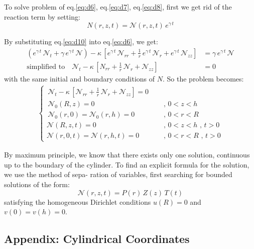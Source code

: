 \documentclass[../main.tex]{subfiles}
\begin{document}
To solve problem of eq.\ref{eq:d6}, eq.\ref{eq:d7}, eq.\ref{eq:d8}, first we get rid of the reaction term by setting:
\begin{equation}
    N(r,z,t) = \mathcal{N}(r,z,t) \, e^{\gamma \, t} \label{eq:d10}
\end{equation}

By substituting eq.\ref{eq:d10} into eq.\ref{eq:d6}, we get:
\begin{align}
    (e^{\gamma \, t} \, \mathcal{N}_t + \gamma \, e^{\gamma \, t} \, \mathcal{N}) - \kappa \, [e^{\gamma \, t} \, \mathcal{N}_{rr} + \frac{1}{r} \, e^{\gamma \, t} \, \mathcal{N}_r + e^{\gamma \, t} \, \mathcal{N}_{zz}] &= \gamma \, e^{\gamma \, t} \, \mathcal{N} \nonumber \\
    \text{simplified to} \quad \mathcal{N}_t - \kappa \, [N_{rr} + \frac{1}{r} \, \mathcal{N}_r + \mathcal{N}_{zz}] &= 0 \label{eq:d11}
\end{align}
with the same initial and boundary conditions of $N$. So the problem becomes:
\begin{align}
    \begin{cases}
        \, \mathcal{N}_t - \kappa \, [\mathcal{N}_{rr} + \frac{1}{r} \, \mathcal{N}_r + \mathcal{N}_{zz}] = 0 \\
        \, \mathcal{N}_0(R, z) = 0 & \quad \text{ ,  } 0 < z < h \\
        \, \mathcal{N}_0(r, 0) = \mathcal{N}_0(r, h) = 0 & \quad \text{ ,  } 0 < r < R \\
        \mathcal{N}(R, z, t) = 0 & \quad \text{ ,  } 0 < z < h \text{ ,  } t > 0 \\
        \mathcal{N}(r, 0, t) = \mathcal{N}(r, h, t) = 0 & \quad \text{ ,  } 0 < r < R \text{ ,  } t > 0 
    \end{cases}
\end{align}

By maximum principle, we know that there exists only one solution, continuous up to the boundary of the cylinder. To find an explicit formula for the solution, we use the method of sepa- ration of variables, first searching for bounded solutions of the form:
\begin{equation}
    \mathcal{N}(r,z,t) = P(r) \, Z(z) \, T(t)
\end{equation}
satisfying the homogeneous Dirichlet conditions $u(R) = 0$ and $v(0) = v(h) = 0$.




\subsection{Appendix: Cylindrical Coordinates}
\end{document}
